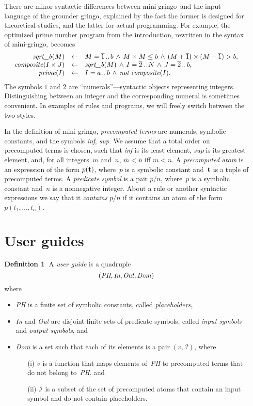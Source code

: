 \documentclass{tlp}
\def\ar{\leftarrow}
\def\beq{\begin{equation}}
\def\eeq#1{\label{#1}\end{equation}}
\def\ba{\begin{array}}
\def\ea{\end{array}}
\def\gringo{{\sc gringo}}
\def\num{\overline}
\newcommand{\I}{\mathcal{I}}
\begin{document}
There are minor syntactic differences between
mini-\gringo\ and the input language of the grounder \gringo,
explained by the fact the former is designed for theoretical studies, and the
latter for actual programming.
For example, the optimized prime number program from the introduction,
rewritten in the syntax of mini-\gringo, becomes
$$\ba {rcl}
\emph{sqrt\_b\/}(M) &\ar& M = \num  1\,..\,b \,\land\, M\times M \leq b
          \,\land\, (M+\num 1)\times(M+\num 1) > b,\\
          \emph{composite\/}(I\times J) &\ar& \emph{sqrt\_b\/}(M) \,\land\,
                 I = \num 2\,..\,N \,\land\, J = \num 2\,..\,b,\\
                 \emph{prime\/}(I) &\ar& I = a\,..\,b
                 \,\land\, \emph{not}\ \emph{composite\/}(I).
\ea
$$
The symbols $\num 1$ and $\num 2$ are ``numerals''---syntactic objects
representing integers. Distinguishing between an integer and the corresponding
numeral is sometimes convenient.  In examples of rules and programs, we will
freely switch between the two styles.

In the definition of mini-\gringo,
\emph{precomputed terms} are numerals,
  symbolic constants, and the symbols \emph{inf}, \emph{sup}.
  We assume that a total order on precomputed terms is chosen, such that
  \emph{inf} is its least element, \emph{sup} is its greatest element, and,
 for all integers~$m$ and~$n$,   $\num m < \num n$ iff $m<n$.
A  \emph{precomputed atom} is an expression of the form $p({\bf t})$, where~$p$
  is a symbolic constant and~$\bf t$ is a tuple of precomputed terms.
  A \emph{predicate symbol} is a pair $p/n$, where~$p$ is a symbolic
  constant and~$n$ is a nonnegative integer.  About a rule or another
  syntactic expressions we say that it \emph{contains} $p/n$ if it
  contains an atom of the form $p(t_1,\dots,t_n)$.

\section{User guides}\label{sec:ug}

{\bf Definition 1}$\;$
A \emph{user guide} is a quadruple
\beq
(\emph{PH},\emph{In},\emph{Out},\emph{Dom\/})
\eeq{ug}
where
\begin{itemize}
\item \emph{PH} is a finite set of symbolic constants, called
  \emph{placeholders},
\item \emph{In} and \emph{Out} are disjoint finite sets of predicate
  symbols, called \emph{input symbols} and \emph{output symbols},
  and
\item \emph{Dom} is a set such that each of its elements is a pair $(v,\I)$,
  where
  \begin{itemize}
  \item [(i)]$v$ is a function that maps elements of~\emph{PH} to
      precomputed terms that do not belong to~\emph{PH}, and
    \item  [(ii)] $\I$ is a subset of the set of precomputed atoms that contain
      an input symbol and do not contain placeholders.
\end{itemize}
\end{itemize}
\end{document}
